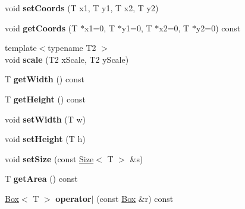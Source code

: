\begin{DoxyCompactItemize}
\item 
\hypertarget{class_box_a34c9185bc13058d287f762f70a44738b}{
void {\bfseries setCoords} (T x1, T y1, T x2, T y2)}
\label{class_box_a34c9185bc13058d287f762f70a44738b}

\item 
\hypertarget{class_box_a08182031d00233aa02f6b9380d213c86}{
void {\bfseries getCoords} (T $\ast$x1=0, T $\ast$y1=0, T $\ast$x2=0, T $\ast$y2=0) const }
\label{class_box_a08182031d00233aa02f6b9380d213c86}

\item 
\hypertarget{class_box_a710290e5022b29be36491593d26e938d}{
{\footnotesize template$<$typename T2 $>$ }\\void {\bfseries scale} (T2 xScale, T2 yScale)}
\label{class_box_a710290e5022b29be36491593d26e938d}

\item 
\hypertarget{class_box_a25420c9b205a53b1345ff2dce6d2f351}{
T {\bfseries getWidth} () const }
\label{class_box_a25420c9b205a53b1345ff2dce6d2f351}

\item 
\hypertarget{class_box_a4658e043d83b5360bc186a73c1859313}{
T {\bfseries getHeight} () const }
\label{class_box_a4658e043d83b5360bc186a73c1859313}

\item 
\hypertarget{class_box_a7cfb90348077f6476e5f9aa7ff8d851d}{
void {\bfseries setWidth} (T w)}
\label{class_box_a7cfb90348077f6476e5f9aa7ff8d851d}

\item 
\hypertarget{class_box_a88efe31d53ff3895a3036e7f183152d7}{
void {\bfseries setHeight} (T h)}
\label{class_box_a88efe31d53ff3895a3036e7f183152d7}

\item 
\hypertarget{class_box_acd6d5e40c68328ff7a000574a306483b}{
void {\bfseries setSize} (const \hyperlink{class_size}{Size}$<$ T $>$ \&s)}
\label{class_box_acd6d5e40c68328ff7a000574a306483b}

\item 
\hypertarget{class_box_aa929e8c0b27bef9952ee0609eacf9181}{
T {\bfseries getArea} () const }
\label{class_box_aa929e8c0b27bef9952ee0609eacf9181}

\item 
\hypertarget{class_box_ad98b489652ab9b1e98171bc07c3526b0}{
\hyperlink{class_box}{Box}$<$ T $>$ {\bfseries operator$|$} (const \hyperlink{class_box}{Box} \&r) const }
\label{class_box_ad98b489652ab9b1e98171bc07c3526b0}


\end{DoxyCompactItemize}
